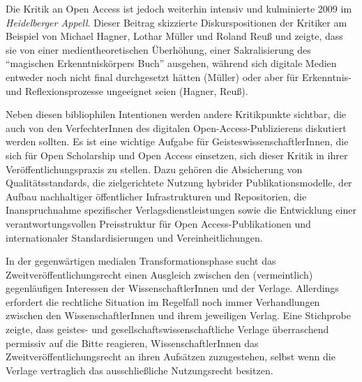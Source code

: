 \documentclass[a4paper,
fontsize=11pt,
oneside,
numbers=noperiodatend,
parskip=half-,
bibliography=totoc,
final
]{scrartcl}
\begin{document}
Die Kritik an Open Access ist jedoch weiterhin intensiv und kulminierte
2009 im \emph{Heidelberger Appell}. Dieser Beitrag skizzierte
Diskurspositionen der Kritiker am Beispiel von Michael Hagner, Lothar
Müller und Roland Reuß und zeigte, dass sie von einer
medientheoretischen Überhöhung, einer Sakralisierung des
\enquote{magischen Erkenntniskörpers Buch} ausgehen, während sich
digitale Medien entweder noch nicht final durchgesetzt hätten (Müller)
oder aber für Erkenntnis- und Reflexionsprozesse ungeeignet seien
(Hagner, Reuß).

Neben diesen bibliophilen Intentionen werden andere Kritikpunkte
sichtbar, die auch von den VerfechterInnen des digitalen
Open-Access-Publizierens diskutiert werden sollten. Es ist eine wichtige
Aufgabe für GeisteswissenschaftlerInnen, die sich für Open Scholarship
und Open Access einsetzen, sich dieser Kritik in ihrer
Veröffentlichungspraxis zu stellen. Dazu gehören die Absicherung von
Qualitätsstandards, die zielgerichtete Nutzung hybrider
Publikationsmodelle, der Aufbau nachhaltiger öffentlicher
Infrastrukturen und Repositorien, die Inanspruchnahme spezifischer
Verlagsdienstleistungen sowie die Entwicklung einer verantwortungsvollen
Preisstruktur für Open Access-Publikationen und internationaler
Standardisierungen und Vereinheitlichungen.

In der gegenwärtigen medialen Transformationsphase sucht das
Zweitveröffentlichungsrecht einen Ausgleich zwischen den (vermeintlich)
gegenläufigen Interessen der WissenschaftlerInnen und der Verlage.
Allerdings erfordert die rechtliche Situation im Regelfall noch immer
Verhandlungen zwischen den WissenschaftlerInnen und ihrem jeweiligen
Verlag. Eine Stichprobe zeigte, dass geistes- und
gesellschaftswissenschaftliche Verlage überraschend permissiv auf die
Bitte reagieren, WissenschaftlerInnen das Zweitveröffentlichungsrecht an
ihren Aufsätzen zuzugestehen, selbst wenn die Verlage vertraglich das
ausschließliche Nutzungsrecht besitzen.
\end{document}
